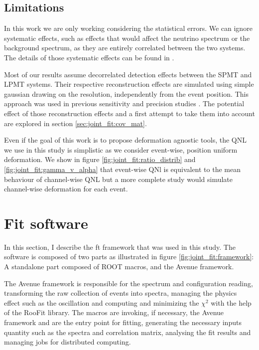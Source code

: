\documentclass[../main.tex]{subfiles}
\begin{document}
\subsection{Limitations}

In this work we are only working considering the statistical errors. We can ignore systematic effects, such as effects that would affect the neutrino spectrum or the background spectrum, as they are entirely correlated between the two systems. The details of those systematic effects can be found in \cite{juno_collaboration_sub-percent_2022}.

Most of our results assume decorrelated detection effects between the SPMT and LPMT systems. Their respective reconstruction effects are simulated using simple gaussian drawing on the resolution, independently from the event position. This approach was used in previous sensitivity and precision studies \cite{juno_collaboration_sub-percent_2022, abusleme_potential_2024}. The potential effect of those reconstruction effects and a first attempt to take them into account are explored in section \ref{sec:joint_fit:cov_mat}.

Even if the goal of this work is to propose deformation agnostic tools, the QNL we use in this study is simplistic as we consider event-wise, position uniform deformation. We show in figure \ref{fig:joint_fit:ratio_distrib} and \ref{fig:joint_fit:gamma_v_alpha} that event-wise QNl is equivalent to the mean behaviour of channel-wise QNL but a more complete study would simulate channel-wise deformation for each event.

\section{Fit software}
\label{sec:joint_fit:framework}

In this section, I describe the ft framework that was used in this study. The software is composed of two parts as illustrated in figure \ref{fig:joint_fit:framework}: A standalone part composed of ROOT \cite{brun_root-projectroot_2022} macros, and the Avenue framework.

The Avenue framework is responsible for the spectrum and configuration reading, transforming the raw collection of events into spectra, managing the physics effect such as the oscillation and computing and minimizing the $\chi^2$ with the help of the RooFit library. The macros are invoking, if necessary, the Avenue framework and are the entry point for fitting, generating the necessary inputs quantity such as the spectra and correlation matrix, analysing the fit results and managing jobs for distributed computing.
\end{document}
